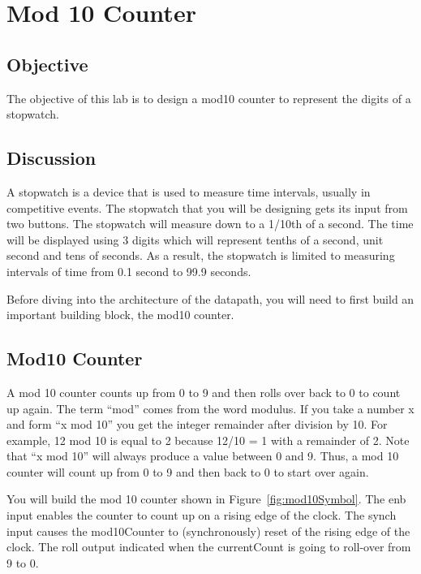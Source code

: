 \chapter{Mod 10 Counter}
\label{chapter:mod10}
\graphicspath{ {./Lab08Mod10Counter/Fig} }


\hypertarget{objective}{%
\section{Objective}\label{section:mod10objective}}

The objective of this lab is to design a mod10 counter to represent the
digits of a stopwatch.

\section{Discussion}

A stopwatch is a device that is used to measure time intervals, usually
in competitive events. The stopwatch that you will be designing gets its
input from two buttons. The stopwatch will measure down to a 1/10th of a
second. The time will be displayed using 3 digits which will represent
tenths of a second, unit second and tens of seconds. As a result, the
stopwatch is limited to measuring intervals of time from 0.1 second to
99.9 seconds.

Before diving into the architecture of the datapath, you will need to
first build an important building block, the mod10 counter.

\section{Mod10 Counter}

A mod 10 counter counts up from 0 to 9 and then rolls over back to 0 to
count up again. The term ``mod'' comes from the word modulus. If you
take a number x and form ``x mod 10'' you get the integer remainder
after division by 10. For example, 12 mod 10 is equal to 2 because 12/10
= 1 with a remainder of 2. Note that ``x mod 10'' will always produce a
value between 0 and 9. Thus, a mod 10 counter will count up from 0 to 9
and then back to 0 to start over again.

You will build the mod 10 counter shown in Figure~\ref{fig:mod10Symbol}. The enb input
enables the counter to count up on a rising edge of the clock. The synch
input causes the mod10Counter to (synchronously) reset of the rising
edge of the clock. The roll output indicated when the currentCount is
going to roll-over from 9 to 0.

